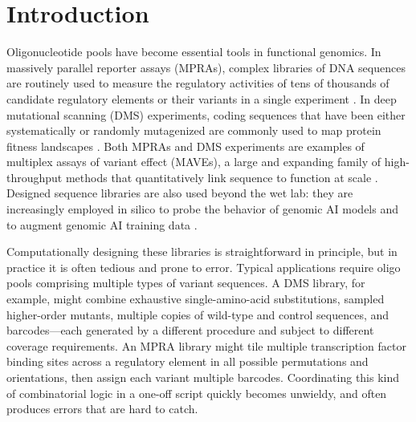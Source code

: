\documentclass[twoside]{kinney_lab_preprintstyle}
\begin{document}
\maketitle

\section*{Introduction}

Oligonucleotide pools have become essential tools in functional genomics. In massively parallel reporter assays (MPRAs), complex libraries of DNA sequences are routinely used to measure the regulatory activities of tens of thousands of candidate regulatory elements or their variants in a single experiment \citep{Patwardhan2009cw, Kinney2010tn, Melnikov2012dw, Inoue2015cs, Klein2020, Romero2023, LaFleur2024aa}. In deep mutational scanning (DMS) experiments, coding sequences that have been either systematically or randomly mutagenized are commonly used to map protein fitness landscapes \citep{Fowler2010gt, Hietpas2011bp, Fowler2014gq, Olson2014iq, Adams2016dka, Findlay2018kd, Starr2020aa}. Both MPRAs and DMS experiments are examples of multiplex assays of variant effect (MAVEs), a large and expanding family of high-throughput methods that quantitatively link sequence to function at scale \citep{Kinney2019jc, Starita2017ec, Weile2018gm}. Designed sequence libraries are also used beyond the wet lab: they are increasingly employed in silico to probe the behavior of genomic AI models \citep{Avsec2021bpnet, Toneyan2024creme, Seitz2024squid, Seitz2025, Nagai2026review} and to augment genomic AI training data \citep{Lee2023}.

Computationally designing these libraries is straightforward in principle, but in practice it is often tedious and prone to error. Typical applications require oligo pools comprising multiple types of variant sequences. A DMS library, for example, might combine exhaustive single-amino-acid substitutions, sampled higher-order mutants, multiple copies of wild-type and control sequences, and barcodes---each generated by a different procedure and subject to different coverage requirements. An MPRA library might tile multiple transcription factor binding sites across a regulatory element in all possible permutations and orientations, then assign each variant multiple barcodes. Coordinating this kind of combinatorial logic in a one-off script quickly becomes unwieldy, and often produces errors that are hard to catch.
\end{document}
